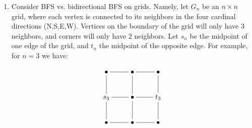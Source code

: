 \documentclass[12pt]{article}
\begin{document}
\begin{enumerate}
\begin{enumerate}
	\item \label{1c} Consider BFS vs. bidirectional BFS on grids. Namely, let $G_n$ be an $n \times n$ grid, where each vertex is connected to its neighbors in the four cardinal directions (N,S,E,W). Vertices on the boundary of the grid will only have 3 neighbors, and corners will only have 2 neighbors. Let $s_n$ be the midpoint of one edge of the grid, and $t_n$ the midpoint of the opposite edge. For example, for $n=3$ we have:
	
	\[
\xymatrix{
\bullet \ar@{-}[r] \ar@{-}[d] & \bullet \ar@{-}[r] \ar@{-}[d] & \bullet \ar@{-}[d] \\ 
s_3 \ar@{-}[r] \ar@{-}[d] & \bullet \ar@{-}[r] \ar@{-}[d] & t_3 \ar@{-}[d] \\ 
\bullet \ar@{-}[r] & \bullet \ar@{-}[r] & \bullet
}
\]


\end{enumerate}
\end{enumerate}
\end{document}
